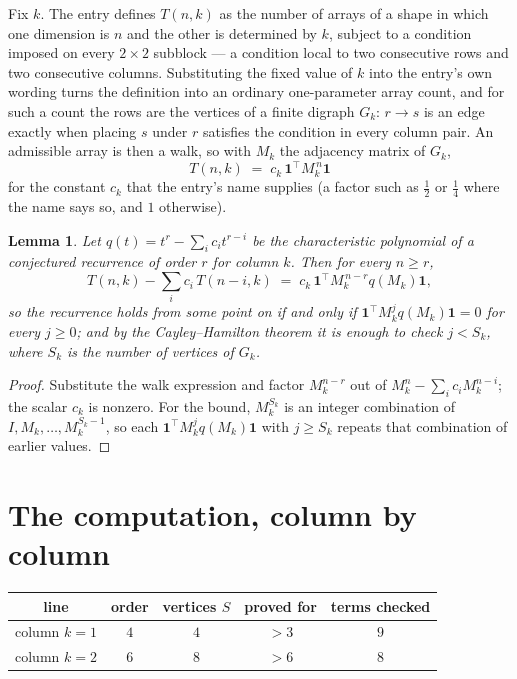 \documentclass[11pt,a4paper]{article}
\theoremstyle{plain}
\newtheorem{lemma}[theorem]{Lemma}
\theoremstyle{definition}
\begin{document}
Fix $k$. The entry defines $T(n,k)$ as the number of arrays of a shape in which one dimension
is $n$ and the other is determined by $k$, subject to a condition imposed on every
$2\times2$ subblock --- a condition local to two consecutive rows and two consecutive columns.
Substituting the fixed value of $k$ into the entry's own wording turns the definition into an
ordinary one-parameter array count, and for such a count the rows are the vertices of a finite
digraph $G_k$: $r\to s$ is an edge exactly when placing $s$ under $r$ satisfies the condition
in every column pair. An admissible array is then a walk, so with $M_k$ the adjacency matrix
of $G_k$,
\[
T(n,k)\;=\;c_k\,\mathbf{1}^{\!\top}M_k^{\,n}\mathbf{1}
\]
for the constant $c_k$ that the entry's name supplies (a factor such as $\tfrac12$ or
$\tfrac14$ where the name says so, and $1$ otherwise).

\begin{lemma}\label{lem:crit}
Let $q(t)=t^{r}-\sum_i c_it^{r-i}$ be the characteristic polynomial of a conjectured
recurrence of order $r$ for column $k$. Then for every $n\ge r$,
\[
T(n,k)-\sum_i c_i\,T(n-i,k)\;=\;c_k\,\mathbf{1}^{\!\top}M_k^{\,n-r}q(M_k)\mathbf{1},
\]
so the recurrence holds from some point on if and only if
$\mathbf{1}^{\!\top}M_k^{j}q(M_k)\mathbf{1}=0$ for every $j\ge0$; and by the
Cayley--Hamilton theorem it is enough to check $j<S_k$, where $S_k$ is the number of vertices
of $G_k$.
\end{lemma}

\begin{proof}
Substitute the walk expression and factor $M_k^{n-r}$ out of $M_k^{n}-\sum_ic_iM_k^{n-i}$;
the scalar $c_k$ is nonzero. For the bound, $M_k^{S_k}$ is an integer combination of
$I,M_k,\dots,M_k^{S_k-1}$, so each $\mathbf{1}^{\!\top}M_k^{j}q(M_k)\mathbf{1}$ with
$j\ge S_k$ repeats that combination of earlier values.
\end{proof}

\section{The computation, column by column}

\begin{center}
\begin{tabular}{ccccc}
line & order & vertices $S$ & proved for & terms checked \\ \hline
column $k$$=1$ & $4$ & $4$ & $>3$ & $9$ \\
column $k$$=2$ & $6$ & $8$ & $>6$ & $8$ \\
\end{tabular}
\end{center}
\end{document}

